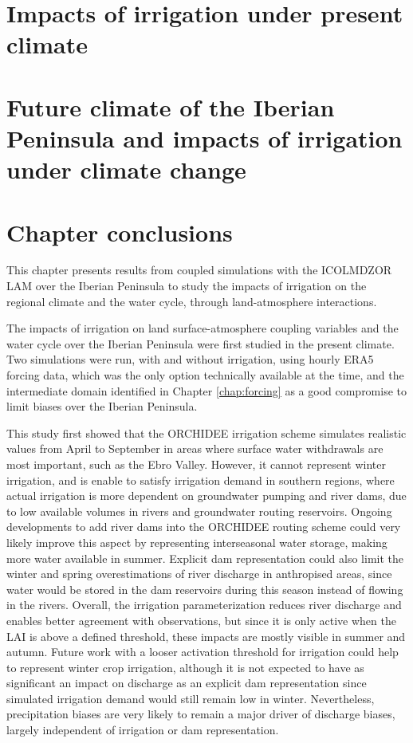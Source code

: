 \section{Impacts of irrigation under present climate}
\label{sec:article1}

\clearpage

\section{Future climate of the Iberian Peninsula and impacts of irrigation under climate change}
\label{sec:climate_change}

\clearpage

\section{Chapter conclusions}

This chapter presents results from coupled simulations with the ICOLMDZOR LAM over the Iberian Peninsula to study the impacts of irrigation on the regional climate and the water cycle, through land-atmosphere interactions. 

\hfill

The impacts of irrigation on land surface-atmosphere coupling variables and the water cycle over the Iberian Peninsula were first studied in the present climate. Two simulations were run, with and without irrigation, using hourly ERA5 forcing data, which was the only option technically available at the time, and the intermediate domain identified in Chapter \ref{chap:forcing} as a good compromise to limit biases over the Iberian Peninsula.

This study first showed that the ORCHIDEE irrigation scheme simulates realistic values from April to September in areas where surface water withdrawals are most important, such as the Ebro Valley. However, it cannot represent winter irrigation, and is enable to satisfy irrigation demand in southern regions, where actual irrigation is more dependent on groundwater pumping and river dams, due to low available volumes in rivers and groundwater routing reservoirs. Ongoing developments to add river dams into the ORCHIDEE routing scheme \citep{baratgin_modeling_2024} could very likely improve this aspect by representing interseasonal water storage, making more water available in summer.
Explicit dam representation could also limit the winter and spring overestimations of river discharge in anthropised areas, since water would be stored in the dam reservoirs during this season instead of flowing in the rivers. 
Overall, the irrigation parameterization reduces river discharge and enables better agreement with observations, but since it is only active when the LAI is above a defined threshold, these impacts are mostly visible in summer and autumn. Future work with a looser activation threshold for irrigation could help to represent winter crop irrigation, although it is not expected to have as significant an impact on discharge as an explicit dam representation since simulated irrigation demand would still remain low in winter. Nevertheless, precipitation biases are very likely to remain a major driver of discharge biases, largely independent of irrigation or dam representation.

